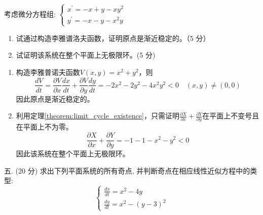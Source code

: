 \begin{exercise}
    考虑微分方程组: $\left\{\begin{array}{l}x^{\prime}=-x+y-x y^2 \\ y^{\prime}=-x-y-x^2 y\end{array}\right.$
    \begin{enumerate}
        \item 试通过构造李雅谱洛夫函数，证明原点是渐近稳定的。（5 分）
        \item 试证明该系统在整个平面上无极限环。(5 分)
    \end{enumerate}
\end{exercise}

\begin{solution}
    \begin{enumerate}
        \item 构造李雅普诺夫函数$V(x,y)=x^2+y^2$，则
              \[
                  \frac{dV}{dt}=\frac{\partial V}{\partial x}\frac{dx}{dt}+\frac{\partial V}{\partial y}\frac{dy}{dt}=-2x^2-2y^2-4x^2y^2<0\quad(x,y)\ne (0,0)
              \]
              因此原点是渐近稳定的。
        \item 利用定理\ref{theorem:limit_cycle_existence}，只需证明$\frac{\partial X}{\partial x}+\frac{\partial Y}{\partial y}$在平面上不变号且在平面上不为零。
              \[
                  \frac{\partial X}{\partial x}+\frac{\partial Y}{\partial y}=-1-1-x^2-y^2<0
              \]
              因此该系统在整个平面上无极限环。
    \end{enumerate}
\end{solution}

\begin{exercise}
    五. (20 分) 求出下列平面系统的所有奇点, 并判断奇点在相应线性近似方程中的类型:
    $$
        \left\{\begin{array}{l}
            \frac{d x}{d t}=x^2-4 y \\
            \frac{d y}{d t}=x^2-(y-3)^2
        \end{array}\right.
    $$
\end{exercise}

